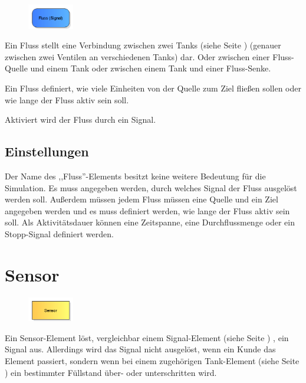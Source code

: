 \begin{figure}
\vspace{-22pt}
\includegraphics[width=2cm]{imageModelElementTankFlowBySignal.png}
\vspace{-22pt}
\end{figure}

Ein Fluss stellt eine Verbindung zwischen zwei Tanks (siehe Seite \pageref{ref:ModelElementTank}) 
(genauer zwischen zwei Ventilen an verschiedenen Tanks) dar.
Oder zwischen einer Fluss-Quelle und einem Tank oder zwischen einem Tank und einer Fluss-Senke.

Ein Fluss definiert, wie viele Einheiten von der Quelle zum Ziel fließen sollen oder wie
lange der Fluss aktiv sein soll.

Aktiviert wird der Fluss durch ein Signal.

\subsection*{Einstellungen}

Der Name des ,,Fluss''-Elements besitzt keine weitere Bedeutung für die Simulation.
Es muss angegeben werden, durch welches Signal der Fluss ausgelöst werden soll.
Außerdem müssen jedem Fluss müssen eine Quelle und ein Ziel angegeben werden und es muss
definiert werden, wie lange der Fluss aktiv sein soll. Als Aktivitätsdauer
können eine Zeitspanne, eine Durchflussmenge oder ein Stopp-Signal definiert werden.


\section{Sensor}
\label{ref:ModelElementTankSensor}

\begin{figure}
\vspace{-22pt}
\includegraphics[width=2cm]{imageModelElementTankSensor.png}
\vspace{-22pt}
\end{figure}

Ein Sensor-Element löst, vergleichbar einem Signal-Element (siehe Seite \pageref{ref:ModelElementSignal}) ,
ein Signal aus. Allerdings wird das Signal nicht ausgelöst, wenn ein Kunde das Element
passiert, sondern wenn bei einem zugehörigen Tank-Element (siehe Seite \pageref{ref:ModelElementTank}) 
ein bestimmter Füllstand über- oder unterschritten wird. 

